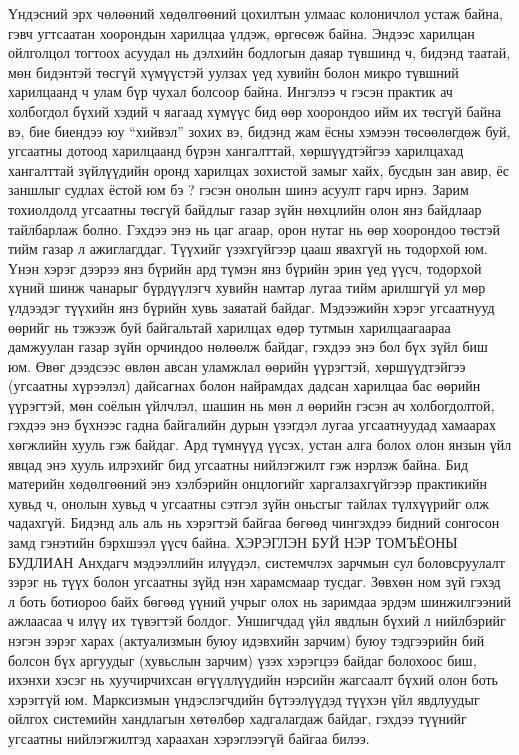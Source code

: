 Үндэсний эрх чөлөөний хөдөлгөөний цохилтын улмаас колоничлол устаж байна, гэвч угтсаатан хоорондын харилцаа үлдэж, өргөсөж байна. Эндээс харилцан ойлголцол тогтоох асуудал нь дэлхийн бодлогын даяар түвшинд ч, бидэнд таатай, мөн бидэнтэй төсгүй хүмүүстэй уулзах үед хувийн болон микро түвшний харилцаанд ч улам бүр чухал болсоор байна. Ингэлээ ч гэсэн практик ач холбогдол бүхий хэдий ч яагаад хүмүүс бид өөр хоорондоо ийм их төсгүй байна вэ, бие биендээ юу “хийвэл” зохих вэ, бидэнд жам ёсны хэмээн төсөөлөгдөж буй, угсаатны дотоод харилцаанд бүрэн хангалттай, хөршүүдтэйгээ харилцахад хангалттай зүйлүүдийн оронд харилцах зохистой замыг хайх, бусдын зан авир, ёс заншлыг судлах ёстой юм бэ ? гэсэн онолын шинэ асуулт гарч ирнэ. Зарим тохиолдолд угсаатны төсгүй байдлыг газар зүйн нөхцлийн олон янз байдлаар тайлбарлаж болно. Гэхдээ энэ нь цаг агаар, орон нутаг нь өөр хоорондоо төстэй тийм газар л ажиглагддаг. Түүхийг үзэхгүйгээр цааш явахгүй нь тодорхой юм.
Үнэн хэрэг дээрээ янз бүрийн ард түмэн янз бүрийн эрин үед үүсч, тодорхой хүний шинж чанарыг бүрдүүлэгч хувийн намтар лугаа тийм арилшгүй ул мөр үлдээдэг түүхийн янз бүрийн хувь заяатай байдаг. Мэдээжийн хэрэг угсаатнууд өөрийг нь тэжээж буй байгальтай харилцах өдөр тутмын харилцаагаараа дамжуулан газар зүйн орчиндоо нөлөөлж байдаг, гэхдээ энэ бол бүх зүйл биш юм. Өвөг дээдсээс өвлөн авсан уламжлал өөрийн үүрэгтэй, хөршүүдтэйгээ (угсаатны хүрээлэл) дайсагнах болон найрамдах дадсан харилцаа бас өөрийн үүрэгтэй, мөн соёлын үйлчлэл, шашин нь мөн л өөрийн гэсэн ач холбогдолтой, гэхдээ энэ бүхнээс гадна байгалийн дурын үзэгдэл лугаа угсаатнуудад хамаарах хөгжлийн хууль гэж байдаг. Ард түмнүүд үүсэх, устан алга болох олон янзын үйл явцад энэ хууль илрэхийг бид угсаатны нийлэгжилт гэж нэрлэж байна.
Бид материйн хөдөлгөөний энэ хэлбэрийн онцлогийг харгалзахгүйгээр практикийн хувьд ч, онолын хувьд ч угсаатны сэтгэл зүйн оньсгыг тайлах түлхүүрийг олж чадахгүй. Бидэнд аль аль нь хэрэгтэй байгаа бөгөөд чингэхдээ бидний сонгосон замд гэнэтийн бэрхшээл үүсч байна.
ХЭРЭГЛЭН БУЙ НЭР ТОМЪЁОНЫ БУДЛИАН
Анхдагч мэдээллийн илүүдэл, системчлэх зарчмын сул боловсруулалт зэрэг нь түүх болон угсаатны зүйд нэн харамсмаар тусдаг. Зөвхөн ном зүй гэхэд л боть ботиороо байх бөгөөд үүний учрыг олох нь заримдаа эрдэм шинжилгээний ажлаасаа ч илүү их түвэгтэй болдог. Уншигчдад үйл явдлын бүхий л нийлбэрийг нэгэн зэрэг харах (актуализмын буюу идэвхийн зарчим) буюу тэдгээрийн бий болсон бүх аргуудыг (хувьслын зарчим) үзэх хэрэгцээ байдаг болохоос биш, ихэнхи хэсэг нь хуучирчихсан өгүүллүүдийн нэрсийн жагсаалт бүхий олон боть хэрэггүй юм. Марксизмын үндэслэгчдийн бүтээлүүдэд түүхэн үйл явдлуудыг ойлгох системийн хандлагын хөтөлбөр хадгалагдаж байдаг, гэхдээ түүнийг угсаатны нийлэгжилтэд хараахан хэрэглээгүй байгаа билээ.
